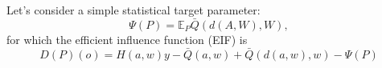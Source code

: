 \documentclass[landscape,a0paper,fontscale=0.285]{baposter} %
\begin{document}
\begin{poster}
{Let's consider a simple statistical target parameter:
\begin{equation}
\Psi(P) = \mathbb{E}_P{\bar{Q}(d(A, W), W)},
\end{equation}
for which the efficient influence function (EIF) is
\begin{equation}
D(P)(o) = H(a, w){y - \bar{Q}(a, w)} + \bar{Q}(d(a, w), w) - \Psi(P)
\end{equation}
}


\end{poster}
\end{document}
